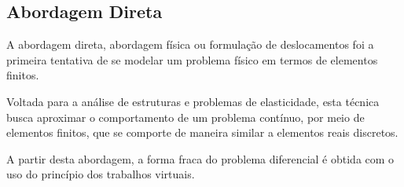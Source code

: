 \subsection{Abordagem Direta \\}

A abordagem direta, abordagem física ou formulação de deslocamentos foi a primeira tentativa de se modelar um problema físico em termos de elementos finitos.

Voltada para a análise de estruturas e problemas de elasticidade, esta técnica busca aproximar o comportamento de um problema contínuo, por meio de elementos finitos, que se comporte de maneira similar a elementos reais discretos.
\citep[p. 19]{zien}

A partir desta abordagem, a forma fraca do problema diferencial é obtida com o uso do princípio dos trabalhos virtuais.
\citep[p. 20]{zien}

 


